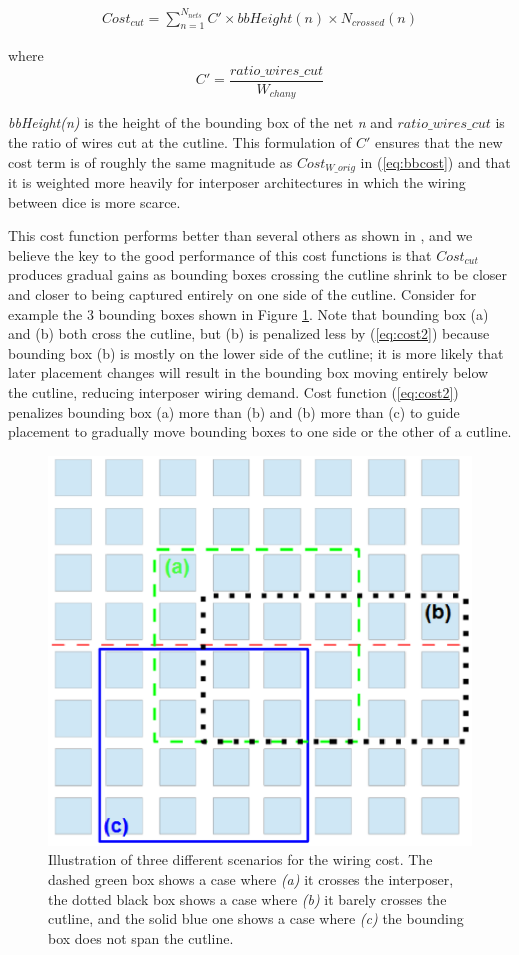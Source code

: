 \documentclass[journal]{IEEEtran}
\begin{document}
\setlength{\arraycolsep}{0.0em}
\begin{multline}
\label{eq:cost2}
Cost_{cut} = \sum_{n=1}^{N_{nets}} C' \times bbHeight(n) \times N_{crossed}(n)
\end{multline}

where 
\setlength{\arraycolsep}{0.0em}
\begin{equation}
\label{eq:cprime}
C' = \frac{ratio\_wires\_cut}{W_{chany}}
\end{equation}
\setlength{\arraycolsep}{5pt}

\textit{bbHeight(n)} is the height of the bounding box of the net \textit{n} and $ratio\_wires\_cut$ is the ratio of wires cut at the cutline. This formulation of $C'$ ensures that the new cost term is of roughly the same magnitude as $Cost_{W\_orig}$ in (\ref{eq:bbcost}) and that it is weighted more heavily for interposer architectures in which the wiring between dice is more scarce.

This cost function performs better than several others as shown in \cite{interposer2014}, and we believe the key to the good performance of this cost functions is that $Cost_{cut}$ produces gradual gains as bounding boxes crossing the cutline shrink to be closer and closer to being captured entirely on one side of the cutline. Consider for example the 3 bounding boxes shown in Figure \ref{fig:bb_illustration}. Note that bounding box (a) and (b) both cross the cutline, but (b) is penalized less by (\ref{eq:cost2}) because bounding box (b) is mostly on the lower side of the cutline; it is more likely that later placement changes will result in the bounding box moving entirely below the cutline, reducing interposer wiring demand. Cost function (\ref{eq:cost2}) penalizes bounding box (a) more than (b) and (b) more than (c) to guide placement to gradually move bounding boxes to one side or the other of a cutline.

\begin{figure}[!h]
\centering
\includegraphics[width=0.75\linewidth]{bb_new.eps}
\caption{Illustration of three different scenarios for the wiring cost. The dashed green box shows a case where \textit{(a)} it crosses the interposer, the dotted black box shows a case where \textit{(b)} it barely crosses the cutline, and the solid blue one shows a case where \textit{(c)} the bounding box does not span the cutline.}
\label{fig:bb_illustration}
\end{figure}
\end{document}
